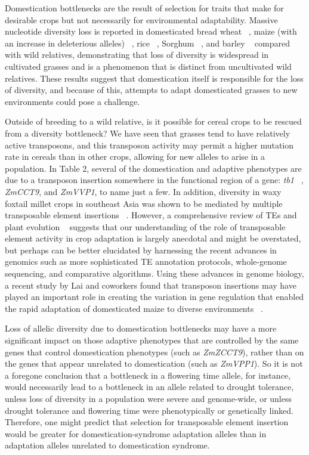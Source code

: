 \documentclass[12pt]{article}
\begin{document}
Domestication bottlenecks are the result of selection for traits that make for desirable crops but not necessarily for environmental adaptability. Massive nucleotide diversity loss is reported in domesticated bread wheat ~\citep{Haudry2007}, maize (with an increase in deleterious alleles) ~\citep{pmid9539756, Wang2017}, rice ~\citep{pmid17218640}, Sorghum ~\citep{Hamblin2006}, and barley ~\citep{Kilian2006} compared with wild relatives, demonstrating that loss of diversity is widespread in cultivated grasses and is a phenomenon that is distinct from uncultivated wild relatives. These results suggest that domestication itself is responsible for the loss of diversity, and because of this, attempts to adapt domesticated grasses to new environments could pose a challenge.  

Outside of breeding to a wild relative, is it possible for cereal crops to be rescued from a diversity bottleneck? We have seen that grasses tend to have relatively active transposons, and this transposon activity may permit a higher mutation rate in cereals than in other crops, allowing for new alleles to arise in a population.  In Table 2, several of the domestication and adaptive phenotypes are due to a transposon insertion somewhere in the functional region of a gene: \textit{tb1} ~\citep{Studer2011}, \textit{ZmCCT9}, and \textit{ZmVVP1}, to name just a few. In addition, diversity in waxy foxtail millet crops in southeast Asia was shown to be mediated by multiple transposable element insertions ~\citep{Kawase2005}. However, a comprehensive review of TEs and plant evolution ~\citep{Lisch2001} suggests that our understanding of the role of transposable element activity in crop adaptation is largely anecdotal and might be overstated, but perhaps can be better elucidated by harnessing the recent advances in genomics such as more sophisticated TE annotation protocols, whole-genome sequencing, and comparative algorithms.  Using these advances in genome biology, a recent study by Lai and coworkers found that transposon insertions may have played an important role in creating the variation in gene regulation that enabled the rapid adaptation of domesticated maize to diverse environments ~\citep{Lai2017}. 

Loss of allelic diversity due to domestication bottlenecks may have a more significant impact on those adaptive phenotypes that are controlled by the same genes that control domestication phenotypes (such as \textit{ZmZCCT9}), rather than on the genes that appear unrelated to domestication (such as \textit{ZmVPP1}).  So it is not a foregone conclusion that a bottleneck in a flowering time allele, for instance, would necessarily lead to a bottleneck in an allele related to drought tolerance, unless loss of diversity in a population were severe and genome-wide, or unless drought tolerance and flowering time were phenotypically or genetically linked. Therefore, one might predict that selection for transposable element insertion would be greater for domestication-syndrome adaptation alleles than in adaptation alleles unrelated to domestication syndrome.  
\end{document}
